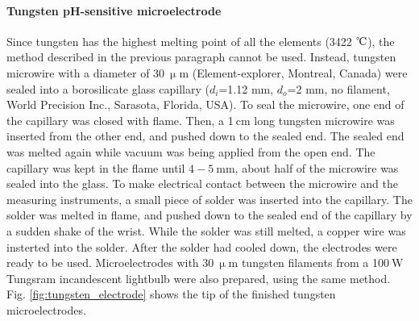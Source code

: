 \paragraph{Tungsten pH-sensitive microelectrode}
Since tungsten has the highest melting point of all the elements (3422 $\celsius$), the method described in the previous paragraph cannot be used.
Instead, tungsten microwire with a diameter of $30~\upmu$m (Element-explorer, Montreal, Canada) were sealed into a borosilicate glass capillary ($d_i$=1.12 mm, $d_o$=2 mm, no filament, World Precision Inc., Sarasota, Florida, USA).
To seal the microwire, one end of the capillary was closed with flame.
Then, a 1$~$cm long tungsten microwire was inserted from the other end, and pushed down to the sealed end.
The sealed end was melted again while vacuum was being applied from the open end.
The capillary was kept in the flame until $4-5~$mm, about half of the microwire was sealed into the glass.
To make electrical contact between the microwire and the measuring instruments, a small piece of solder was inserted into the capillary.
The solder was melted in flame, and pushed down to the sealed end of the capillary by a sudden shake of the wrist.
While the solder was still melted, a copper wire was insterted into the solder.
After the solder had cooled down, the electrodes were ready to be used.
Microelectrodes with $30~\upmu$m tungsten filaments from a 100$~$W Tungsram incandescent lightbulb were also prepared, using the same method.
Fig. \ref{fig:tungsten_electrode} shows the tip of the finished tungsten microelectrodes.

